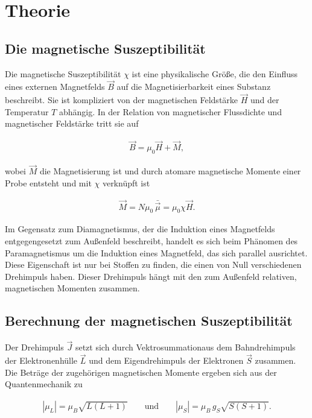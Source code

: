 
\section{Theorie}
\subsection{Die magnetische Suszeptibilität}
Die magnetische Suszeptibilität $\chi$ ist eine physikalische Größe, die den Einfluss eines externen Magnetfelds $\vec B$ auf
die Magnetisierbarkeit eines Substanz beschreibt. Sie ist kompliziert von der magnetischen Feldstärke $\vec H$ und der Temperatur $T$
abhängig. In der Relation von magnetischer Flussdichte und magnetischer Feldstärke tritt sie auf

\begin{align}
 \vec B = \mu_0 \vec H + \vec M,
\end{align}

wobei $\vec M$ die Magnetisierung ist und durch atomare magnetische Momente einer Probe entsteht und mit $\chi$ verknüpft ist

\begin{align}
 \vec M = N \mu_0 \,  \bar{\vec{\mu}} =\mu_0 \chi \vec H.
 \label{eqMagnetisierung}
\end{align}

Im Gegensatz zum Diamagnetismus, der die Induktion eines Magnetfelds entgegengesetzt zum Außenfeld beschreibt, handelt es sich beim
Phänomen des Paramagnetismus um die Induktion eines Magnetfeld, das sich parallel ausrichtet. Diese Eigenschaft ist nur bei Stoffen
zu finden, die einen von Null verschiedenen Drehimpuls haben. Dieser Drehimpuls hängt mit den zum Außenfeld relativen, magnetischen 
Momenten zusammen.

\subsection{Berechnung der magnetischen Suszeptibilität}
Der Drehimpuls $\vec J$ setzt sich durch Vektrosummationaus dem Bahndrehimpuls der Elektronenhülle $\vec L$ und dem Eigendrehimpuls der Elektronen 
$\vec S$ zusammen. Die Beträge der zugehörigen magnetischen Momente ergeben sich aus der Quantenmechanik zu

\begin{align}
 | \mu_L | = \mu_B \sqrt{L(L+1)} \qquad \text{und} \qquad |\mu_S| = \mu_B \, g_S \sqrt{S(S+1)}.
\end{align}


